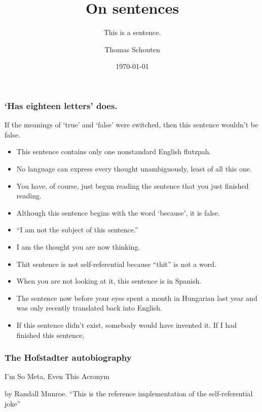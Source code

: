 \documentclass{beamer}
\title{On sentences}
\subtitle{This is a sentence.}
\author{Thomas Schouten}
\date{\today}
\begin{document}
    \frame{\titlepage}


    \begin{framefont}{\small}
        \begin{frame}
            \frametitle{`Has eighteen letters' does.}
            If the meanings of `true' and `false' were switched, then this sentence wouldn't be false.
            \begin{itemize}
                \item This sentence contains only one nonstandard English flutzpah.
                \item No language can express every thought unambiguously, least of all this one.
                \item You have, of course, just begun reading the sentence that you just finished reading.
                \item Although this sentence begins with the word `because', it is false.
                \item ``I am not the subject of this sentence.''
                \item I am the thought you are now thinking.
                \item Thit sentence is not self-referential because ``thit'' is not a word.
                \item When you are not looking at it, this sentence is in Spanish.
                \item The sentence now before your eyes spent a month in Hungarian last year and was only recently translated back into English.
                \item If this sentence didn't exist, somebody would have invented it.
                If I had finished this sentence,
            \end{itemize}
        \end{frame}
    \end{framefont}

    \begin{framefont}{\large}
        \begin{frame}
            \frametitle{The Hofstadter autobiography }

            I'm So Meta, Even This Acronym


            {\tiny by Randall Munroe.
             ``This is the reference implementation of the self-referential joke''}
        \end{frame}
    \end{framefont}
\end{document}
